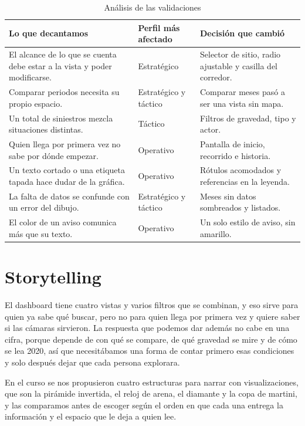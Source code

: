 \documentclass[10pt,a4paper]{article}
\begin{document}
\begin{table}[H]\centering\small
\begin{tabularx}{\linewidth}{LP{3.2cm}L}
\toprule
\textbf{Lo que decantamos} & \textbf{Perfil más afectado} & \textbf{Decisión que cambió}\\
\midrule
El alcance de lo que se cuenta debe estar a la vista y poder modificarse. & Estratégico & Selector de sitio, radio ajustable y casilla del corredor.\\
Comparar periodos necesita su propio espacio. & Estratégico y táctico & Comparar meses pasó a ser una vista sin mapa.\\
Un total de siniestros mezcla situaciones distintas. & Táctico & Filtros de gravedad, tipo y actor.\\
Quien llega por primera vez no sabe por dónde empezar. & Operativo & Pantalla de inicio, recorrido e historia.\\
Un texto cortado o una etiqueta tapada hace dudar de la gráfica. & Operativo & Rótulos acomodados y referencias en la leyenda.\\
La falta de datos se confunde con un error del dibujo. & Estratégico y táctico & Meses sin datos sombreados y listados.\\
El color de un aviso comunica más que su texto. & Operativo & Un solo estilo de aviso, sin amarillo.\\
\bottomrule
\end{tabularx}
\caption{Análisis de las validaciones}
\end{table}

\section{Storytelling}

El dashboard tiene cuatro vistas y varios filtros que se combinan, y eso sirve para quien ya sabe qué buscar, pero no para quien llega por primera vez y quiere saber si las cámaras sirvieron. La respuesta que podemos dar además no cabe en una cifra, porque depende de con qué se compare, de qué gravedad se mire y de cómo se lea 2020, así que necesitábamos una forma de contar primero esas condiciones y solo después dejar que cada persona explorara.

En el curso se nos propusieron cuatro estructuras para narrar con visualizaciones, que son la pirámide invertida, el reloj de arena, el diamante y la copa de martini, y las comparamos antes de escoger según el orden en que cada una entrega la información y el espacio que le deja a quien lee.
\end{document}
